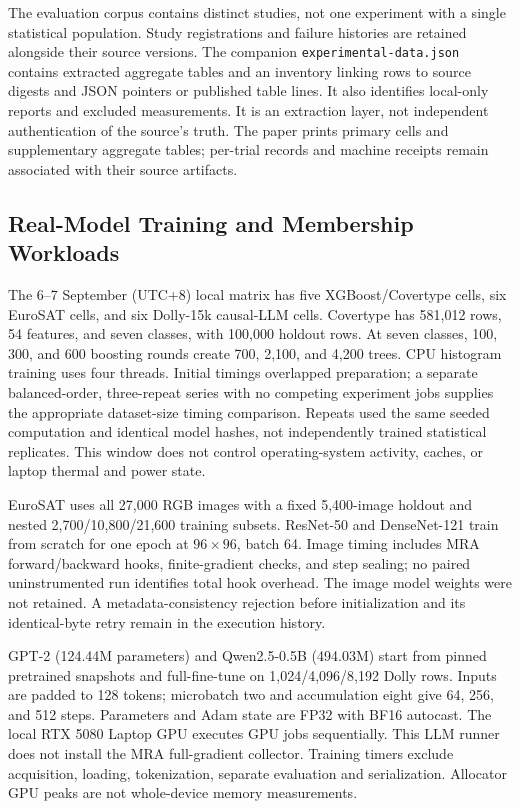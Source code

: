 \documentclass[conference,compsoc]{IEEEtran}
\newcommand{\code}[1]{\texttt{\small #1}}
\begin{document}
The evaluation corpus contains distinct studies, not one experiment with a
single statistical population. Study registrations and failure histories are
retained alongside their source versions. The companion
\code{experimental-data.json} contains extracted aggregate tables and an
inventory linking rows to source digests and JSON pointers or published table
lines. It also identifies local-only reports and excluded measurements. It is
an extraction layer, not independent authentication of the source's truth.
The paper prints primary cells and supplementary aggregate tables; per-trial
records and machine receipts remain associated with their source artifacts.

\subsection{Real-Model Training and Membership Workloads}
The 6--7 September (UTC+8) local matrix has five XGBoost/Covertype cells, six
EuroSAT cells, and six Dolly-15k causal-LLM cells. Covertype has 581,012 rows,
54 features, and seven classes, with 100,000 holdout rows. At seven classes,
100, 300, and 600 boosting rounds create 700, 2,100, and 4,200 trees. CPU
histogram training uses four threads. Initial timings overlapped preparation;
a separate balanced-order, three-repeat series with no competing experiment
jobs supplies the appropriate
dataset-size timing comparison. Repeats used the same seeded computation
and identical model hashes, not independently trained statistical replicates.
This window does not control operating-system activity, caches, or laptop
thermal and power state.

EuroSAT uses all 27,000 RGB images with a fixed 5,400-image holdout and nested
2,700/10,800/21,600 training subsets. ResNet-50 and DenseNet-121 train from
scratch for one epoch at $96\times96$, batch 64. Image timing includes MRA
forward/backward hooks, finite-gradient checks, and step sealing; no paired
uninstrumented run identifies total hook overhead. The image model weights
were not retained. A metadata-consistency rejection before initialization and
its identical-byte retry remain in the execution history.

GPT-2 (124.44M parameters) and Qwen2.5-0.5B (494.03M) start from pinned
pretrained snapshots and full-fine-tune on 1,024/4,096/8,192 Dolly rows. Inputs
are padded to 128 tokens; microbatch two and accumulation eight give 64,
256, and 512 steps. Parameters and Adam state are FP32 with BF16 autocast.
The local RTX 5080 Laptop GPU executes GPU jobs sequentially. This LLM
runner does not install the MRA full-gradient collector. Training timers
exclude acquisition, loading, tokenization, separate evaluation and
serialization. Allocator GPU peaks are not whole-device memory measurements.
\end{document}

